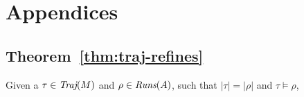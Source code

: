 \section{Appendices}

\subsection{Theorem~\ref{thm:traj-refines}}

Given a $\tau \in \operatorname{\textit{Traj}}(M)$ and $\rho \in \operatorname{\textit{Runs}}(A)$, such that $| \tau | = | \rho |$ and $\tau \models \rho$, 









